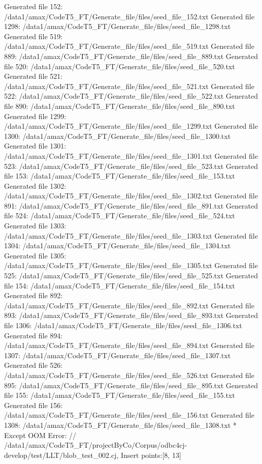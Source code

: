 Generated file 152: /data1/amax/CodeT5_FT/Generate_file/files/seed_file_152.txt
Generated file 1298: /data1/amax/CodeT5_FT/Generate_file/files/seed_file_1298.txt
Generated file 519: /data1/amax/CodeT5_FT/Generate_file/files/seed_file_519.txt
Generated file 889: /data1/amax/CodeT5_FT/Generate_file/files/seed_file_889.txt
Generated file 520: /data1/amax/CodeT5_FT/Generate_file/files/seed_file_520.txt
Generated file 521: /data1/amax/CodeT5_FT/Generate_file/files/seed_file_521.txt
Generated file 522: /data1/amax/CodeT5_FT/Generate_file/files/seed_file_522.txt
Generated file 890: /data1/amax/CodeT5_FT/Generate_file/files/seed_file_890.txt
Generated file 1299: /data1/amax/CodeT5_FT/Generate_file/files/seed_file_1299.txt
Generated file 1300: /data1/amax/CodeT5_FT/Generate_file/files/seed_file_1300.txt
Generated file 1301: /data1/amax/CodeT5_FT/Generate_file/files/seed_file_1301.txt
Generated file 523: /data1/amax/CodeT5_FT/Generate_file/files/seed_file_523.txt
Generated file 153: /data1/amax/CodeT5_FT/Generate_file/files/seed_file_153.txt
Generated file 1302: /data1/amax/CodeT5_FT/Generate_file/files/seed_file_1302.txt
Generated file 891: /data1/amax/CodeT5_FT/Generate_file/files/seed_file_891.txt
Generated file 524: /data1/amax/CodeT5_FT/Generate_file/files/seed_file_524.txt
Generated file 1303: /data1/amax/CodeT5_FT/Generate_file/files/seed_file_1303.txt
Generated file 1304: /data1/amax/CodeT5_FT/Generate_file/files/seed_file_1304.txt
Generated file 1305: /data1/amax/CodeT5_FT/Generate_file/files/seed_file_1305.txt
Generated file 525: /data1/amax/CodeT5_FT/Generate_file/files/seed_file_525.txt
Generated file 154: /data1/amax/CodeT5_FT/Generate_file/files/seed_file_154.txt
Generated file 892: /data1/amax/CodeT5_FT/Generate_file/files/seed_file_892.txt
Generated file 893: /data1/amax/CodeT5_FT/Generate_file/files/seed_file_893.txt
Generated file 1306: /data1/amax/CodeT5_FT/Generate_file/files/seed_file_1306.txt
Generated file 894: /data1/amax/CodeT5_FT/Generate_file/files/seed_file_894.txt
Generated file 1307: /data1/amax/CodeT5_FT/Generate_file/files/seed_file_1307.txt
Generated file 526: /data1/amax/CodeT5_FT/Generate_file/files/seed_file_526.txt
Generated file 895: /data1/amax/CodeT5_FT/Generate_file/files/seed_file_895.txt
Generated file 155: /data1/amax/CodeT5_FT/Generate_file/files/seed_file_155.txt
Generated file 156: /data1/amax/CodeT5_FT/Generate_file/files/seed_file_156.txt
Generated file 1308: /data1/amax/CodeT5_FT/Generate_file/files/seed_file_1308.txt
* Except OOM Error: // /data1/amax/CodeT5_FT/projectByCo/Corpus/odbc4cj-develop/test/LLT/blob_test_002.cj, Insert points:[8, 13]
